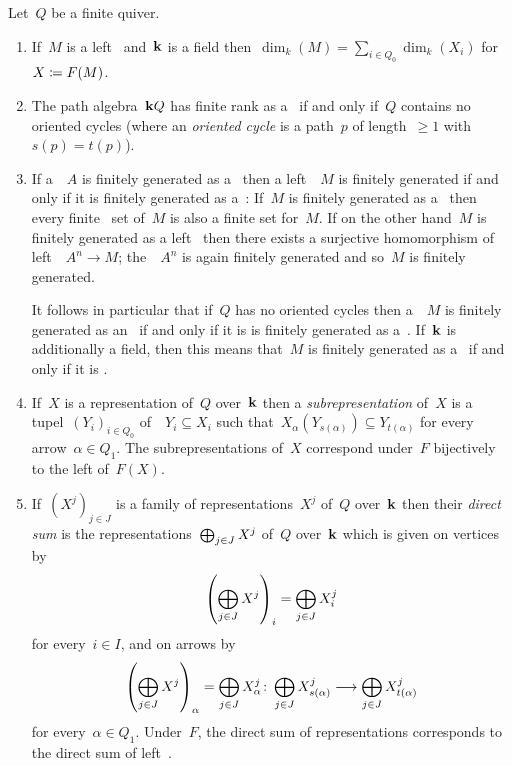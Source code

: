 \begin{remark}
  Let~$Q$ be a finite quiver.
  \begin{enumerate}
    \item
      If~$M$ is a left~{} and~{$\kf$} is a field then~$\dim_k(M) = \sum_{i \in Q_0} \dim_k(X_i)$ for~$X \coloneqq F(M)$.
    \item
      The path algebra~$\mathbf{k} Q$ has finite rank as a~{\module{$\kf$}} if and only if~$Q$ contains no oriented cycles (where an \emph{oriented cycle} is a path~$p$ of length~$\geq 1$ with~$s(p) = t(p)$).
    \item
      If a~{\kalg}~$A$ is finitely generated as a~{\module{$\kf$}} then a left~{}~$M$ is finitely generated if and only if it is finitely generated as a~{\module{$\kf$}}:
      If~$M$ is finitely generated as a~{\module{$\kf$}} then every finite~ set of~$M$ is also a finite  set for~$M$.
      If on the other hand~$M$ is finitely generated as a left~{} then there exists a surjective homomorphism of left~{}~$A^n \to M$;
      the~{}~$A^n$ is again finitely generated and so~$M$ is finitely generated.
      
      It follows in particular that if~$Q$ has no oriented cycles then a~{}~$M$ is finitely generated as an~{} if and only if it is is finitely generated as a~{\module{$\kf$}}.
      If~$\kf$ is additionally a field, then this means that~$M$ is finitely generated as a~{} if and only if it is {\fd}.
    \item
      If~$X$ is a representation of~$Q$ over~$\kf$ then a \emph{subrepresentation} of~$X$ is a tupel~$(Y_i)_{i \in Q_0}$ of~{\submodules{$\kf$}}~$Y_i \subseteq X_i$ such that~$X_\alpha( Y_{s(\alpha)} ) \subseteq Y_{t(\alpha)}$ for every arrow~$\alpha \in Q_1$.
      The subrepresentations of~$X$ correspond under~$F$ bijectively to the left {} of~$F(X)$.
    \item
      If~$(X^j)_{j \in J}$ is a family of representations~$X^j$ of~$Q$ over~$\kf$ then their \emph{direct sum} is the representations~$\bigoplus_{j \in J} X^j$ of~$Q$ over~$\kf$ which is given on vertices by
      \[
          \left( \bigoplus_{j \in J} X^j \right)_i
        = \bigoplus_{j \in J} X^j_i
      \]
      for every~$i \in I$, and on arrows by
      \[
                \left( \bigoplus_{j \in J} X^j \right)_\alpha
        =       \bigoplus_{j \in J} X^j_\alpha
        \colon  \bigoplus_{j \in J} X^j_{s(\alpha)}
        \longrightarrow \bigoplus_{j \in J} X^j_{t(\alpha)}
      \]
      for every~$\alpha \in Q_1$.
      Under~$F$, the direct sum of representations corresponds to the direct sum of left~{}.
  \end{enumerate}
\end{remark}





